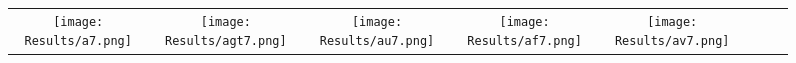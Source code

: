 \documentclass[journal]{IEEEtran}
\begin{document}
\begin{figure*}[!t]
	
	\begin{tabular}{cccccccc}
	    \begin{minipage}{32pt}
			\texttt{[image: Results/a7.png]}
\end{minipage}
		&
		\hspace{0.4cm}
		\begin{minipage}{32pt}
			\texttt{[image: Results/agt7.png]}
\end{minipage}
		&
		\hspace{0.4cm}
		\begin{minipage}{32pt}
			\texttt{[image: Results/au7.png]}
\end{minipage}
		&
		\hspace{0.4cm}
		\begin{minipage}{32pt}
			\texttt{[image: Results/af7.png]}
\end{minipage}
		&
		\hspace{0.4cm}
		\begin{minipage}{32pt}
			\texttt{[image: Results/av7.png]}
\end{minipage}
		&
		

\end{tabular}
\end{figure*}
\end{document}
